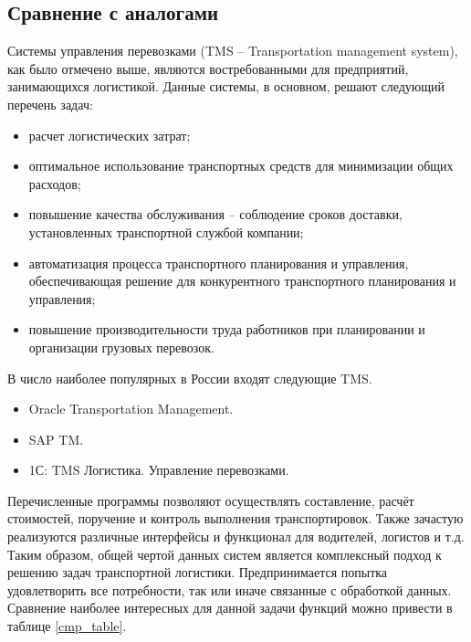 \subsection{Сравнение с аналогами}
	Системы управления перевозками (TMS -- Transportation management system), как было отмечено выше, являются востребованными для предприятий, занимающихся логистикой. Данные системы, в основном, решают следующий перечень задач\cite{subj:tms_cmp}:
	\begin{itemize}
		\item расчет логистических затрат;
		\item оптимальное использование транспортных средств для минимизации
		общих расходов;
		\item повышение качества обслуживания -- соблюдение сроков доставки, установленных транспортной службой компании;
		\item автоматизация процесса транспортного планирования и управления,
		обеспечивающая решение для конкурентного транспортного планирования
		и управления;
		\item повышение производительности труда работников при планировании и
		организации грузовых перевозок.
	\end{itemize}

	\hfill
	
	В число наиболее популярных в России входят следующие TMS.
	\begin{itemize}
		\item Oracle Transportation Management.
		\item SAP TM.
		\item 1С: TMS Логистика. Управление перевозками.
	\end{itemize}

	Перечисленные программы позволяют осуществлять составление, расчёт стоимостей, поручение и контроль выполнения транспортировок. Также зачастую реализуются различные интерфейсы и функционал для водителей, логистов и т.д. Таким образом, общей чертой данных систем является комплексный подход к решению задач транспортной логистики. Предпринимается попытка удовлетворить все потребности, так или иначе связанные с обработкой данных. Сравнение наиболее интересных для данной задачи функций\cite{subj:tms_cmp} можно привести в таблице \ref{cmp_table}.
	
